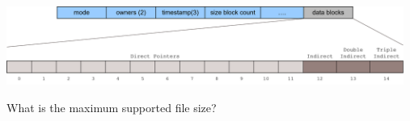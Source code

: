 \begin{slide}


    \includegraphics[width=130mm]{inode-struct-2.png}
    \bigskip

    What is the maximum supported file size?

\end{slide}

\begin{slide}

\end{slide}

